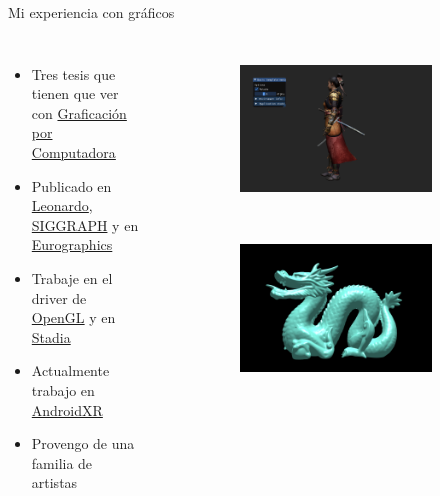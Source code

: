 \begin{frame}{Mi experiencia con gráficos}
\begin{columns}
    \begin{itemize}
         \item Tres tesis que tienen que ver con \href{https://en.wikipedia.org/wiki/Computer_graphics}{Graficación por Computadora}
         \item Publicado en \href{https://direct.mit.edu/leon}{Leonardo}, \href{https://www.siggraph.org/}{SIGGRAPH} y en \href{https://www.eg.org/wp/eurographics-publications/}{Eurographics}
         \item Trabaje en el driver de \href{https://www.opengl.org/}{OpenGL} y en \href{https://stadia.google.com/gg/}{Stadia}
         \item Actualmente trabajo en \href{https://www.android.com/xr/}{AndroidXR}
         \item Provengo de una familia de artistas
     \end{itemize}
\begin{figure}[htp]
 \centering
 \begin{subfigure}[b]{0.4\textwidth}
   \includegraphics[width=\textwidth]{img/menuTemplate}
 \end{subfigure}
~
 \begin{subfigure}[b]{0.4\textwidth}
   \includegraphics[width=\textwidth]{img/completo}

\end{subfigure}
\end{figure}
\end{columns}
\end{frame}
